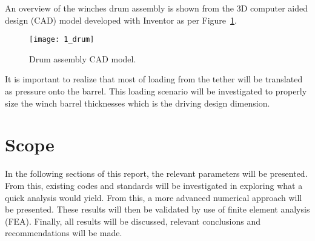 An overview of the winches drum assembly is shown from the 3D computer aided design (CAD) model developed with Inventor \cite{INVENTOR} as per Figure~\ref{fig:1_drum}.
\begin{figure}[H]
	\centering
	\texttt{[image: 1\_drum]}
	\caption{Drum assembly CAD model.}
	\label{fig:1_drum}
\end{figure}

It is important to realize that most of loading from the tether will be translated as pressure onto the barrel. This loading scenario will be investigated to properly size the winch barrel thicknesses which is the driving design dimension.

\section{Scope}

In the following sections of this report, the relevant parameters will be presented. From this, existing codes and standards will be investigated in exploring what a quick analysis would yield. From this, a more advanced numerical approach will be presented. These results will then be validated by use of finite element analysis (FEA). Finally, all results will be discussed, relevant conclusions and recommendations will be made.